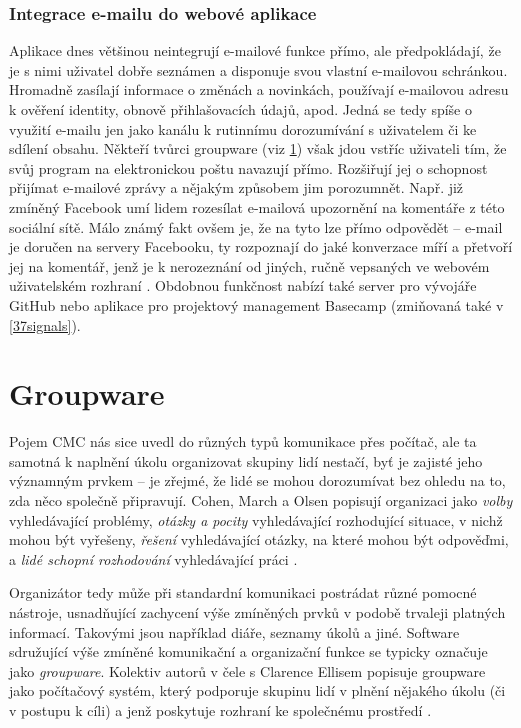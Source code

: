 \documentclass[12pt,oneside,final]{fithesis2}
\begin{document}
\subsubsection*{Integrace e-mailu do webové aplikace}\label{emailWebApp}
Aplikace dnes většinou neintegrují e-mailové funkce přímo, ale předpokládají, že je s nimi uživatel dobře seznámen a disponuje svou vlastní e-mailovou schránkou. Hromadně zasílají informace o změnách a novinkách, používají e-mailovou adresu k ověření identity, obnově přihlašovacích údajů, apod. Jedná se tedy spíše o využití e-mailu jen jako kanálu k rutinnímu dorozumívání s uživatelem či ke sdílení obsahu. Někteří tvůrci groupware (viz \ref{groupware}) však jdou vstříc uživateli tím, že svůj program na elektronickou poštu navazují přímo. Rozšiřují jej o schopnost přijímat e-mailové zprávy a nějakým způsobem jim porozumnět. Např. již zmíněný Facebook umí lidem rozesílat e-mailová upozornění na komentáře z této sociální sítě. Málo známý fakt ovšem je, že na tyto lze přímo odpovědět -- e-mail je doručen na servery Facebooku, ty rozpoznají do jaké konverzace míří a přetvoří jej na komentář, jenž je k nerozeznání od jiných, ručně vepsaných ve webovém uživatelském rozhraní \cite{whitnah2010replying}. Obdobnou funkčnost nabízí také server pro vývojáře GitHub nebo aplikace pro projektový management Basecamp (zmiňovaná také v \ref{37signals}).


\section{Groupware}\label{groupware}
Pojem CMC nás sice uvedl do různých typů komunikace přes počítač, ale ta samotná k naplnění úkolu organizovat skupiny lidí nestačí, byť je zajisté jeho významným prvkem -- je zřejmé, že lidé se mohou dorozumívat bez ohledu na to, zda něco společně připravují. Cohen, March a Olsen popisují organizaci jako {\it volby} vyhledávající problémy, {\it otázky a pocity} vyhledávající rozhodující situace, v nichž mohou být vyřešeny, {\it řešení} vyhledávající otázky, na které mohou být odpověďmi, a {\it lidé schopní rozhodování} vyhledávající práci \cite{cohen1972garbage} \cite{grudin1994groupware}.

Organizátor tedy může při standardní komunikaci postrádat různé pomocné nástroje, usnadňující zachycení výše zmíněných prvků v podobě trvaleji platných informací. Takovými jsou například diáře, seznamy úkolů a jiné. Software sdružující výše zmíněné komunikační a organizační funkce se typicky označuje jako {\it groupware}. Kolektiv autorů v čele s Clarence Ellisem popisuje groupware jako počítačový systém, který podporuje skupinu lidí v plnění nějakého úkolu (či v postupu k cíli) a jenž poskytuje rozhraní ke společnému prostředí \cite{ellis1991groupware}.
\end{document}
